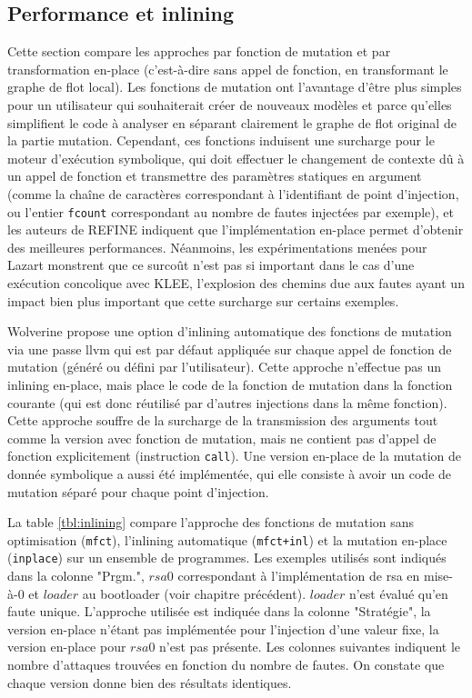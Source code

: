             
  
        \subsection{Performance et inlining}
        \label{sec:lazart-mfct-inl}
 	
 	        Cette section compare les approches par fonction de mutation et par transformation en-place (c'est-à-dire sans appel de fonction, en transformant le graphe de flot local).
 	        Les fonctions de mutation ont l'avantage d'être plus simples pour un utilisateur qui souhaiterait créer de nouveaux modèles et parce qu'elles simplifient le code à analyser en séparant clairement le graphe de flot original de la partie mutation.
 	        Cependant, ces fonctions induisent une surcharge pour le moteur d'exécution symbolique, qui doit effectuer le changement de contexte dû à un appel de fonction et transmettre des paramètres statiques en argument (comme la chaîne de caractères correspondant à l'identifiant de point d'injection, ou l'entier \texttt{fcount} correspondant au nombre de fautes injectées par exemple), et les auteurs de REFINE \cite{Georgakoudis/ICHPCNSA17} indiquent que l'implémentation en-place permet d'obtenir des meilleures performances.
 	        Néanmoins, les expérimentations menées pour Lazart monstrent que ce surcoût n'est pas si important dans le cas d'une exécution concolique avec KLEE, l'explosion des chemins due aux fautes ayant un impact bien plus important que cette surcharge sur certains exemples.
 	        
            Wolverine propose une option d'inlining automatique des fonctions de mutation via une passe \gls{llvm} qui est par défaut appliquée sur chaque appel de fonction de mutation (généré ou défini par l'utilisateur). Cette approche n'effectue pas un inlining en-place, mais place le code de la fonction de mutation dans la fonction courante (qui est donc réutilisé par d'autres injections dans la même fonction). Cette approche souffre de la surcharge de la transmission des arguments tout comme la version avec fonction de mutation, mais ne contient pas d'appel de fonction explicitement (instruction \texttt{call}).
            Une version en-place de la mutation de donnée symbolique a aussi été implémentée, qui elle consiste à avoir un code de mutation séparé pour chaque point d'injection.
            
            La table \ref{tbl:inlining} compare l'approche des fonctions de mutation sans optimisation (\texttt{mfct}), l'inlining automatique (\texttt{mfct+inl}) et la mutation en-place (\texttt{inplace}) sur un ensemble de programmes. Les exemples utilisés sont indiqués dans la colonne "Prgm.", $rsa0$ correspondant à l'implémentation de \gls{rsa} en mise-à-0 et $loader$ au bootloader (voir chapitre précédent). $loader$ n'est évalué qu'en faute unique.
            L'approche utilisée est indiquée dans la colonne "Stratégie", la version en-place n'étant pas implémentée pour l'injection d'une valeur fixe, la version en-place pour $rsa0$ n'est pas présente.
            Les colonnes suivantes indiquent le nombre d'attaques trouvées en fonction du nombre de fautes. On constate que chaque version donne bien des résultats identiques. 
            
